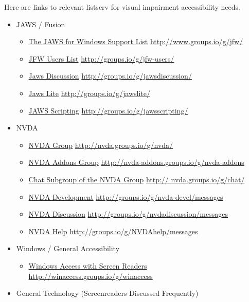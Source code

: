 \documentclass[12pt,letterpaper,twoside,openright]{report}
\begin{document}
\begin{appendices}
Here are links to relevant listserv for visual impairment accessibility needs.
\begin{itemize}[leftmargin=*]
\item JAWS / Fusion
\begin{itemize}[leftmargin=2em]
\item \href{http://www.groups.io/g/jfw/}{The JAWS for Windows Support List}  \break\url{http://www.groups.io/g/jfw/} 
\item \href{http://groups.io/g/jfw-users/}{JFW Users List}  \break\url{http://groups.io/g/jfw-users/}
\item \href{http://groups.io/g/jawsdiscussion/}{Jaws Discussion}  \break\url{http://groups.io/g/jawsdiscussion/}
\item \href{http://groups.io/g/jawslite/}{Jaws Lite}  \break\url{http://groups.io/g/jawslite/}
\item \href{http://groups.io/g/jawsscripting/}{JAWS Scripting}  \break\url{http://groups.io/g/jawsscripting/}
\end{itemize}
\item NVDA
\begin{itemize}[leftmargin=2em]
\item \href{http://nvda.groups.io/g/nvda/ }{NVDA Group}  \break\url{http://nvda.groups.io/g/nvda/ }
\item \href{http://nvda-addons.groups.io/g/nvda-addons}{NVDA Addons Group}  \break\url{http://nvda-addons.groups.io/g/nvda-addons}
\item \href{http://nvda.groups.io/g/chat/ }{Chat Subgroup of the NVDA Group}  \break\url{http:// nvda.groups.io/g/chat/ }
\item \href{http://groups.io/g/nvda-devel/messages}{NVDA Development}  \break\url{http://groups.io/g/nvda-devel/messages}
\item \href{http://groups.io/g/nvdadiscussion/messages}{NVDA Discussion}  \break\url{http://groups.io/g/nvdadiscussion/messages}
\item \href{http://groups.io/g/NVDAhelp/messages}{NVDA Help}  \break\url{http://groups.io/g/NVDAhelp/messages}
\end{itemize}
\item Windows / General Accessibility
\begin{itemize}[leftmargin=2em]
\item \href{http://winaccess.groups.io/g/winaccess}{Windows Access with Screen Readers}  \break\url{http://winaccess.groups.io/g/winaccess}
\end{itemize}
\item General Technology (Screenreaders Discussed Frequently)

\end{itemize}
\end{appendices}
\end{document}
